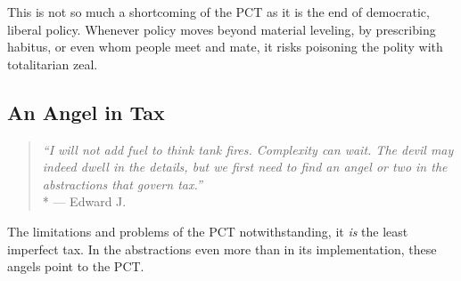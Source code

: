 This is not so much a shortcoming of the PCT as it is the end of democratic, liberal policy.
Whenever policy moves beyond material leveling, by prescribing habitus, or even whom people meet and mate, it risks poisoning the polity with totalitarian zeal.
\subsection{An Angel in Tax}

\begin{quote}
	\emph{``I will not add fuel to think tank fires.
	Complexity can wait.
	The devil may indeed dwell in the details, but we first need to find an angel or two in the abstractions that govern tax.''}
	\\*
	--- Edward J.\ \citet[6f.]{McCaffery2002}
\end{quote}

The limitations and problems of the PCT notwithstanding, it \emph{is} the least imperfect tax.
In the abstractions even more than in its implementation, these angels point to the PCT.






